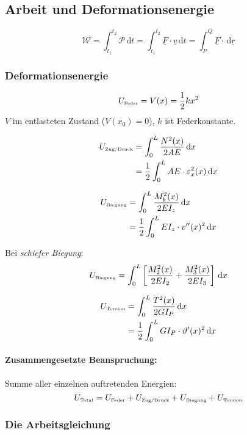 \documentclass{article}
\newcommand{\ud}{\,\mathrm{d}}
\begin{document}
\begin{multicols*}{4}
			\subsection{Arbeit und Deformationsenergie} %
				\[
					\mathcal{W} =
					\int_{t_1}^{t_2} \mathcal{P} \ud t = 
					\int_{t_1}^{t_2} \underline{F} \cdot \underline{v} \ud t = 
					\int_P^Q \underline{F} \cdot \ud \underline{r}
				\]
				\subsubsection{Deformationsenergie} %
					\[
						U_{\mbox{\tiny Feder}} = V(x) = \frac{1}{2} k x^2
					\]
					$V$ im entlasteten Zustand ($V(x_0) = 0$), $k$ ist Federkonstante.

					\begin{align*}
						U_{\mbox{\tiny Zug/Druck}} &= \int_0^L \frac{N^2 (x)}{2AE} \ud x \\
						&= \frac{1}{2} \int_0^L AE \cdot \varepsilon_x^2 (x) \ud x
					\end{align*}
					
					\begin{align*}
						U_{\mbox{\tiny Biegung}} &= \int_0^L \frac{M_b^2 (x)}{2EI_z} \ud x \\
						&= \frac{1}{2} \int_0^L EI_z \cdot v''(x)^2 \ud x
					\end{align*}
					
					Bei \emph{schiefer Biegung}:
					\[
						U_{\mbox{\tiny Biegung}} = \int_0^L \left[ \frac{M_2^2 (x)}{2EI_2} + \frac{M_3^2 (x)}{2EI_3} \right] \ud x
					\]
					
					\begin{align*}
						U_{\mbox{\tiny Torsion}} &= \int_0^L \frac{T^2(x)}{2GI_P} \ud x \\
						&= \frac{1}{2} \int_0^L GI_P \cdot \vartheta'(x)^2 \ud x
					\end{align*}
					
					\paragraph{Zusammengesetzte Beanspruchung:} %
						Summe aller einzelnen auftretenden Energien:
						\[
							U_{\mbox{\tiny Total}}
							= U_{\mbox{\tiny Feder}}
							+ U_{\mbox{\tiny Zug/Druck}}
							+ U_{\mbox{\tiny Biegung}}
							+ U_{\mbox{\tiny Torsion}}
						\]
				\subsubsection{Die Arbeitsgleichung} %

\end{multicols*}
\end{document}
